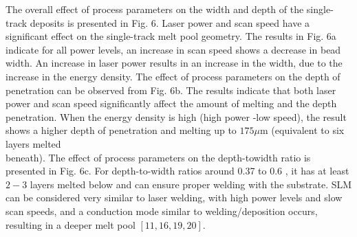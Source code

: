 \documentclass[10pt]{article}
\begin{document}
The overall effect of process parameters on the width and depth of the single-track deposits is presented in Fig. 6. Laser power and scan speed have a significant effect on the single-track melt pool geometry. The results in Fig. 6a indicate for all power levels, an increase in scan speed shows a decrease in bead width. An increase in laser power results in an increase in the width, due to the increase in the energy density. The effect of process parameters on the depth of penetration can be observed from Fig. 6b. The results indicate that both laser power and scan speed significantly affect the amount of melting and the depth penetration. When the energy density is high (high power -low speed), the result shows a higher depth of penetration and melting up to $175 \mu \mathrm{m}$ (equivalent to six layers melted\\
beneath). The effect of process parameters on the depth-towidth ratio is presented in Fig. 6c. For depth-to-width ratios around 0.37 to 0.6 , it has at least $2-3$ layers melted below and can ensure proper welding with the substrate. SLM can be considered very similar to laser welding, with high power levels and slow scan speeds, and a conduction mode similar to welding/deposition occurs, resulting in a deeper melt pool $[11,16,19,20]$.
\end{document}
